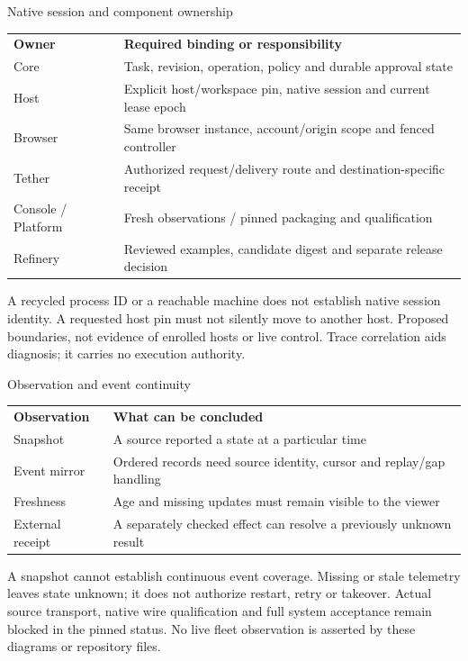 \begin{frame}[label=fleet-identity]{Native session and component ownership}
\begin{tabular}{p{.22\linewidth}p{.69\linewidth}}
\textbf{Owner} & \textbf{Required binding or responsibility} \\
Core & Task, revision, operation, policy and durable approval state \\
Host & Explicit host/workspace pin, native session and current lease epoch \\
Browser & Same browser instance, account/origin scope and fenced controller \\
Tether & Authorized request/delivery route and destination-specific receipt \\
Console / Platform & Fresh observations / pinned packaging and qualification \\
Refinery & Reviewed examples, candidate digest and separate release decision \\
\end{tabular}
\par\medskip
A recycled process ID or a reachable machine does not establish native session
identity. A requested host pin must not silently move to another host.
\vfill
{\footnotesize Proposed boundaries, not evidence of enrolled hosts or live control.
Trace correlation aids diagnosis; it carries no execution authority.}
\end{frame}
\begin{frame}[label=fleet-observation]{Observation and event continuity}
\begin{tabular}{p{.25\linewidth}p{.66\linewidth}}
\textbf{Observation} & \textbf{What can be concluded} \\
Snapshot & A source reported a state at a particular time \\
Event mirror & Ordered records need source identity, cursor and replay/gap handling \\
Freshness & Age and missing updates must remain visible to the viewer \\
External receipt & A separately checked effect can resolve a previously unknown result \\
\end{tabular}
\par\medskip
A snapshot cannot establish continuous event coverage. Missing or stale telemetry
leaves state unknown; it does not authorize restart, retry or takeover.
\vfill
{\footnotesize Actual source transport, native wire qualification and full system
acceptance remain blocked in the pinned status. No live fleet observation is
asserted by these diagrams or repository files.}
\end{frame}
